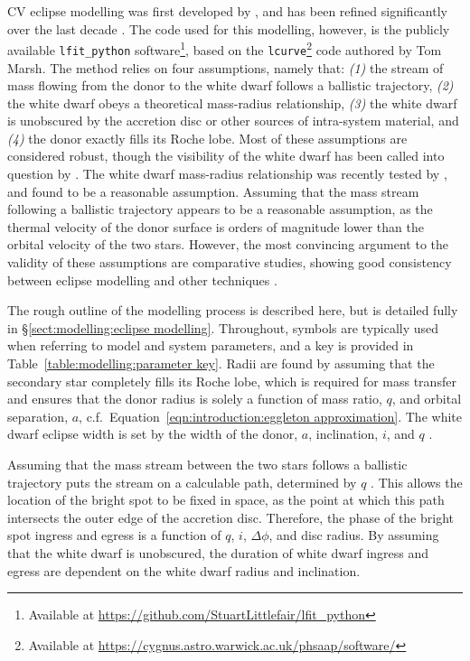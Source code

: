 CV eclipse modelling was first developed by \citet{wood1986}, and has been refined significantly over the last decade \citep{Savoury2011, littlefair2014, mcallister2017, McAllister2019}. The code used for this modelling, however, is the publicly available \lstinline{lfit_python} software\footnote{Available at \href{https://github.com/StuartLittlefair/lfit_python/tree/d36f5449350ef9cad6a285d6fd4cb9bdcd443c13}{https://github.com/StuartLittlefair/lfit\_python}}, based on the \lstinline{lcurve}\footnote{Available at \href{https://cygnus.astro.warwick.ac.uk/phsaap/software/}{https://cygnus.astro.warwick.ac.uk/phsaap/software/}} code authored by Tom Marsh. The method relies on four assumptions, namely that: \textit{(1)} the stream of mass flowing from the donor to the white dwarf follows a ballistic trajectory, \textit{(2)} the white dwarf obeys a theoretical mass-radius relationship, \textit{(3)} the white dwarf is unobscured by the accretion disc or other sources of intra-system material, and \textit{(4)} the donor exactly fills its Roche lobe.
Most of these assumptions are considered robust, though the visibility of the white dwarf has been called into question by \citet{Spark2015}.
The white dwarf mass-radius relationship was recently tested by \citet{parsons2017}, and found to be a reasonable assumption.
Assuming that the mass stream following a ballistic trajectory appears to be a reasonable assumption, as the thermal velocity of the donor surface is orders of magnitude lower than the orbital velocity of the two stars.
However, the most convincing argument to the validity of these assumptions are comparative studies, showing good consistency between eclipse modelling and other techniques \citep{tulloch2009,copperwheat2012,savoury2012,sion2022}.

The rough outline of the modelling process is described here, but is detailed fully in \S\ref{sect:modelling:eclipse modelling}. Throughout, symbols are typically used when referring to model and system parameters, and a key is provided in Table~\ref{table:modelling:parameter key}.
Radii are found by assuming that the secondary star completely fills its Roche lobe, which is required for mass transfer and ensures that the donor radius is solely a function of mass ratio, $q$, and orbital separation, $a$, c.f.~Equation~\ref{eqn:introduction:eggleton approximation}.
The white dwarf eclipse width is set by the width of the donor, $a$, inclination, $i$, and $q$ \citep{bailey1979}.

Assuming that the mass stream between the two stars follows a ballistic trajectory puts the stream on a calculable path, determined by $q$ \citep{Lubow1975}. This allows the location of the bright spot to be fixed in space, as the point at which this path intersects the outer edge of the accretion disc. Therefore, the phase of the bright spot ingress and egress is a function of $q$, $i$, $\Delta\phi$, and disc radius.
By assuming that the white dwarf is unobscured, the duration of white dwarf ingress and egress are dependent on the white dwarf radius and inclination.

